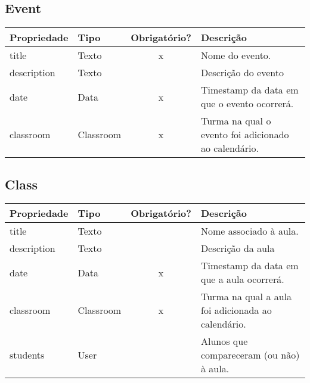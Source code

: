 \subsection{Event} \label{Event}
\begin{table}[H]
	\footnotesize
	\begin{tabularx}{\textwidth}{|X|X|c|p{7.8cm}|}   \hline \rowcolor[rgb]{0.8,0.8,0.8}
		
		\textbf{Propriedade} & \textbf{Tipo} & \textbf{Obrigatório?} & \centerline{\textbf{Descrição}} \\\hline  	
		
		title & Texto & x & Nome do evento. \\\hline		
		description & Texto & {} & Descrição do evento \\\hline		
		date & Data & x & Timestamp da data em que o evento ocorrerá. \\\hline	
		classroom & Classroom & x & Turma na qual o evento foi adicionado ao calendário. \\\hline
		
	\end{tabularx}	
\end{table}

\subsection{Class} \label{Class}
\begin{table}[H]
	\footnotesize
	\begin{tabularx}{\textwidth}{|X|X|c|p{7.8cm}|}   \hline \rowcolor[rgb]{0.8,0.8,0.8}
		
		\textbf{Propriedade} & \textbf{Tipo} & \textbf{Obrigatório?} & \centerline{\textbf{Descrição}} \\\hline  	
		
		title & Texto & {} & Nome associado à aula. \\\hline		
		description & Texto & {} & Descrição da aula \\\hline		
		date & Data & x & Timestamp da data em que a aula ocorrerá. \\\hline
		classroom & Classroom & x & Turma na qual a aula foi adicionada ao calendário. \\\hline
		students & User & {} & Alunos que compareceram (ou não) à aula. \\\hline	
		
	\end{tabularx}	
\end{table}


